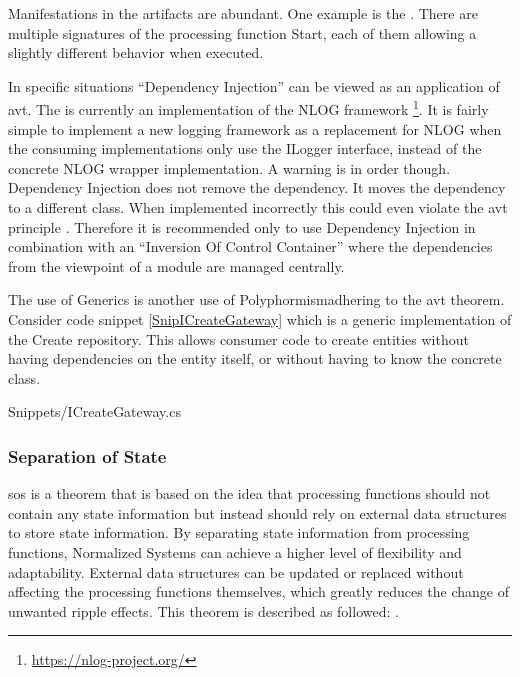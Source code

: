 Manifestations in the artifacts are abundant. One example is the
 \parencite{koks_icommandlineinteractor_2023}.
There are multiple signatures of the processing function Start, each of them allowing a
slightly different behavior when executed.

In specific situations \enquote{Dependency Injection} can be viewed as an application of
\gls{avt}. The  \parencite{koks_logger_2023} is currently an
implementation of the NLOG framework \footnote{\url{https://nlog-project.org/}}. It is
fairly simple to implement a new logging framework as a replacement for NLOG when the
consuming implementations only use the ILogger interface, instead of the concrete NLOG
wrapper implementation. A warning is in order though. Dependency Injection does not remove
the dependency. It moves the dependency to a different class. When implemented incorrectly
this could even violate the \gls{avt} principle \parencite[213]{mannaert_normalized_2016}.
Therefore it is recommended only to use Dependency Injection in combination with an
\enquote{Inversion Of Control Container} where the dependencies from the viewpoint of a
module are managed centrally.

The use of Generics is another use of Polyphormismadhering to the \gls{avt} theorem.
Consider code snippet \ref{SnipICreateGateway}  which is a
generic implementation of the Create repository. This allows consumer code to create
entities without having dependencies on the entity itself, or without having to know the
concrete class.


    {Snippets/ICreateGateway.cs}

\subsubsection{Separation of State}

\gls{sos} is a theorem that is based on the idea that processing functions should not
contain any state information but instead should rely on external data structures to store
state information. By separating state information from processing functions, Normalized
Systems can achieve a higher level of flexibility and adaptability. External data
structures can be updated or replaced without affecting the processing functions
themselves, which greatly reduces the change of unwanted ripple effects. This theorem is
described as followed: \parencite[258]{mannaert_normalized_2016}.

